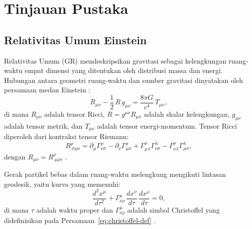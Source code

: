 
\chapter{Tinjauan Pustaka}
\label{chap:tinjauan}

\section{Relativitas Umum Einstein}
\label{sec:relativitas-umum}

Relativitas Umum (GR) mendeskripsikan gravitasi sebagai kelengkungan ruang-waktu empat dimensi yang ditentukan oleh distribusi massa dan energi. Hubungan antara geometri ruang-waktu dan sumber gravitasi dinyatakan oleh persamaan medan Einstein \parencite{Einstein1916GR}:
\begin{equation}
    R_{\mu\nu} - \frac{1}{2}\, R\, g_{\mu\nu} = \frac{8\pi G}{c^4}\, T_{\mu\nu},
    \label{eq:efe}
\end{equation}
di mana $R_{\mu\nu}$ adalah tensor Ricci, $R = g^{\mu\nu}R_{\mu\nu}$ adalah skalar kelengkungan, $g_{\mu\nu}$ adalah tensor metrik, dan $T_{\mu\nu}$ adalah tensor energi-momentum. Tensor Ricci diperoleh dari kontraksi tensor Riemann:
\begin{equation}
    R^\rho_{\ \sigma\mu\nu} = \partial_\mu \Gamma^\rho_{\nu\sigma}
    - \partial_\nu \Gamma^\rho_{\mu\sigma}
    + \Gamma^\rho_{\mu\lambda}\Gamma^\lambda_{\nu\sigma}
    - \Gamma^\rho_{\nu\lambda}\Gamma^\lambda_{\mu\sigma},
    \label{eq:riemann}
\end{equation}
dengan $R_{\mu\nu} = R^\rho_{\ \mu\rho\nu}$ \parencite{Carroll2004SpacetimeGeometry, Misner1973Gravitation}.

Gerak partikel bebas dalam ruang-waktu melengkung mengikuti lintasan geodesik, yaitu kurva yang memenuhi:
\begin{equation}
    \frac{d^2 x^\mu}{d\tau^2}
    + \Gamma^\mu_{\nu\rho}\,\frac{dx^\nu}{d\tau}\,\frac{dx^\rho}{d\tau} = 0,
    \label{eq:geodesic}
\end{equation}
di mana $\tau$ adalah waktu proper dan $\Gamma^\mu_{\nu\rho}$ adalah simbol Christoffel yang didefinisikan pada Persamaan~\eqref{eq:christoffel-def} \parencite{Schutz2009FirstCourse}.


